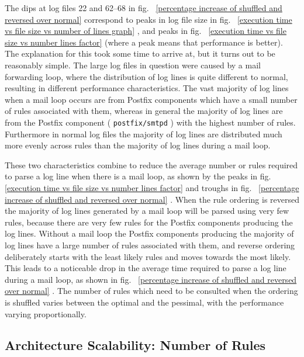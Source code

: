 \documentclass[draft]{svmult}
\newcommand{\refwithpage}[1]{%
    \empty{}\vref{#1}%
}
\newcommand{\daemon}[1]{%
    \texttt{postfix/#1}%
}
\begin{document}
The dips at log files 22 and 62--68 in fig.~\refwithpage{percentage
increase of shuffled and reversed over normal} correspond to peaks in log
file size in fig.~\refwithpage{execution time vs file size vs number of
lines graph}, and peaks in fig.~\refwithpage{execution time vs file size vs
number lines factor} (where a peak means that performance is better).  The
explanation for this took some time to arrive at, but it turns out to be
reasonably simple.  The large log files in question were caused by a mail
forwarding loop, where the distribution of log lines is quite different to
normal, resulting in different performance characteristics.  The vast
majority of log lines when a mail loop occurs are from Postfix components
which have a small number of rules associated with them, whereas in general
the majority of log lines are from the Postfix component (\daemon{smtpd})
with the highest number of rules.  Furthermore in normal log files the
majority of log lines are distributed much more evenly across rules than
the majority of log lines during a mail loop.

These two characteristics combine to reduce the average number or rules
required to parse a log line when there is a mail loop, as shown by the
peaks in fig.~\refwithpage{execution time vs file size vs number lines
factor} and troughs in fig.~\refwithpage{percentage increase of shuffled
and reversed over normal}.  When the rule ordering is reversed the majority
of log lines generated by a mail loop will be parsed using very few rules,
because there are very few rules for the Postfix components producing the
log lines.  Without a mail loop the Postfix components producing the
majority of log lines have a large number of rules associated with them,
and reverse ordering deliberately starts with the least likely rules and
moves towards the most likely.  This leads to a noticeable drop in the
average time required to parse a log line during a mail loop, as shown in
fig.~\refwithpage{percentage increase of shuffled and reversed over
normal}.  The number of rules which need to be consulted when the ordering
is shuffled varies between the optimal and the pessimal, with the
performance varying proportionally.

\subsection{Architecture Scalability: Number of Rules}
\end{document}
